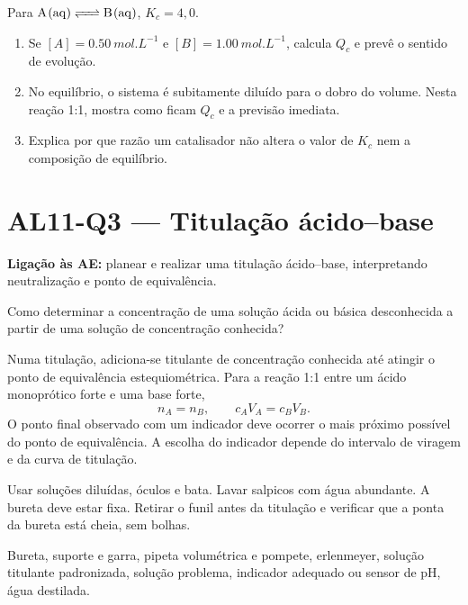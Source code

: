 \documentclass[11pt,a4paper,openany]{book}
\newcounter{exercicio}[chapter]
\renewcommand{\theexercicio}{\thechapter.\arabic{exercicio}}
\newenvironment{exercicio}[1][]%
{\refstepcounter{exercicio}%
\begin{tcolorbox}[breakable,colback=white,colframe=eublue!70,
 title={Exercício \theexercicio\if\relax\detokenize{#1}\relax\else\ --- #1\fi},fonttitle=\bfseries]}%
{\end{tcolorbox}}
\newcommand{\LigAE}[1]{\textbf{Ligação às AE:} #1}
\begin{document}
\begin{exercicio}[$Q_c$ e sentido de evolução]
Para $\ce{A(aq) <=> B(aq)}$, $K_c=4,0$.
\begin{enumerate}[label=\alph*)]
\item Se $[A]=\SI{0.50}{mol.L^{-1}}$ e $[B]=\SI{1.00}{mol.L^{-1}}$, calcula $Q_c$ e prevê o sentido de evolução.
\item No equilíbrio, o sistema é subitamente diluído para o dobro do volume. Nesta reação 1:1, mostra como ficam $Q_c$ e a previsão imediata.
\item Explica por que razão um catalisador não altera o valor de $K_c$ nem a composição de equilíbrio.
\end{enumerate}
\end{exercicio}

\section{AL11-Q3 — Titulação ácido--base}
\LigAE{planear e realizar uma titulação ácido--base, interpretando neutralização e ponto de equivalência.}

\begin{questao}
Como determinar a concentração de uma solução ácida ou básica desconhecida a partir de uma solução de concentração conhecida?
\end{questao}

\begin{fundamento}
Numa titulação, adiciona-se titulante de concentração conhecida até atingir o ponto de equivalência estequiométrica. Para a reação 1:1 entre um ácido monoprótico forte e uma base forte,
\[
n_A=n_B,\qquad c_AV_A=c_BV_B.
\]
O ponto final observado com um indicador deve ocorrer o mais próximo possível do ponto de equivalência. A escolha do indicador depende do intervalo de viragem e da curva de titulação.
\end{fundamento}

\begin{seguranca}
Usar soluções diluídas, óculos e bata. Lavar salpicos com água abundante. A bureta deve estar fixa. Retirar o funil antes da titulação e verificar que a ponta da bureta está cheia, sem bolhas.
\end{seguranca}

\begin{material}
Bureta, suporte e garra, pipeta volumétrica e pompete, erlenmeyer, solução titulante padronizada, solução problema, indicador adequado ou sensor de pH, água destilada.
\end{material}
\end{document}
